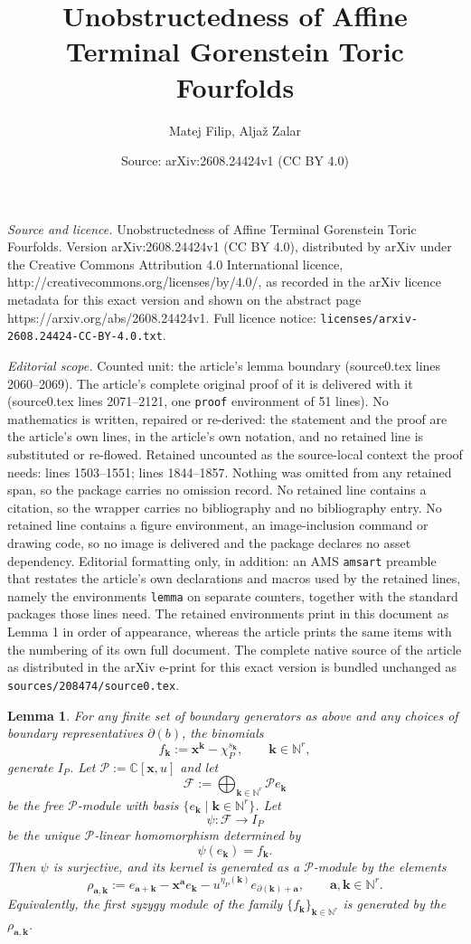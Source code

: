 \documentclass[10pt,a4paper]{amsart}
\title{Unobstructedness of Affine Terminal Gorenstein Toric Fourfolds}
\author{Matej Filip, Alja\v{z} Zalar}
\date{Source: arXiv:2608.24424v1 (CC BY 4.0)}
\newtheorem{lemma}{Lemma}
\newcommand{\CC}{\ensuremath{\mathbb{C}}}
\newcommand{\NN}{\ensuremath{\mathbb{N}}}
\newcommand{\bfa}{\ensuremath{\mathbf{a}}}
\newcommand{\bfk}{\ensuremath{\mathbf{k}}}
\newcommand{\bfx}{\ensuremath{\mathbf{x}}}
\begin{document}
\maketitle

\noindent\emph{Source and licence.} Unobstructedness of Affine Terminal Gorenstein Toric Fourfolds. Version arXiv:2608.24424v1 (CC BY 4.0), distributed by arXiv under the Creative Commons Attribution 4.0 International licence, http://creativecommons.org/licenses/by/4.0/, as recorded in the arXiv licence metadata for this exact version and shown on the abstract page https://arxiv.org/abs/2608.24424v1. Full licence notice: \texttt{licenses/arxiv-2608.24424-CC-BY-4.0.txt}.\par\smallskip

\noindent\textit{Editorial scope.} Counted unit: the article's lemma boundary (source0.tex lines 2060--2069). The article's complete original proof of it is delivered with it (source0.tex lines 2071--2121, one \texttt{proof} environment of 51 lines). No mathematics is written, repaired or re-derived: the statement and the proof are the article's own lines, in the article's own notation, and no retained line is substituted or re-flowed.  Retained uncounted as the source-local context the proof needs: lines 1503--1551; lines 1844--1857.  Nothing was omitted from any retained span, so the package carries no omission record.  No retained line contains a citation, so the wrapper carries no bibliography and no bibliography entry.  No retained line contains a figure environment, an image-inclusion command or drawing code, so no image is delivered and the package declares no asset dependency.  Editorial formatting only, in addition: an AMS \texttt{amsart} preamble that restates the article's own declarations and macros used by the retained lines, namely the environments \texttt{lemma} on separate counters, together with the standard packages those lines need.  The retained environments print in this document as Lemma 1 in order of appearance, whereas the article prints the same items with the numbering of its own full document.  The complete native source of the article as distributed in the arXiv e-print for this exact version is bundled unchanged as \texttt{sources/208474/source0.tex}.
\begin{lemma}\label{lem presentation arbitrary generators}
For any finite set of boundary generators as above and any choices of
boundary representatives \(\partial(b)\), the binomials
\[
f_{\bfk}
:=
\bfx^{\bfk}-\chi_P^{s_{\bfk}},
\qquad
\bfk\in\NN^r,
\]
generate \(I_P\). 
{Let
$
\mathcal P:=\CC[\bfx,u]
$
and let
\[
\mathcal F
:=
\bigoplus_{\bfk\in\NN^r}\mathcal P e_{\bfk}
\]
be the free \(\mathcal P\)-module with basis
\(\{e_{\bfk}\mid\bfk\in\NN^r\}\). Let
\[
\psi\colon\mathcal F\longrightarrow I_P
\]
be the unique \(\mathcal P\)-linear homomorphism determined by
\[
\psi(e_{\bfk})=f_{\bfk}.
\]
Then \(\psi\) is surjective, and its kernel is generated as a
\(\mathcal P\)-module by the elements
\[
\rho_{\bfa,\bfk}
:=
e_{\bfa+\bfk}
-
\bfx^{\bfa}e_{\bfk}
-
u^{\eta_P(\bfk)}
e_{\partial(\bfk)+\bfa},
\qquad
\bfa,\bfk\in\NN^r.
\]
Equivalently, the first syzygy module of the family
\(\{f_{\bfk}\}_{\bfk\in\NN^r}\) is generated by the
\(\rho_{\bfa,\bfk}\).
}
\end{lemma}
\end{document}

